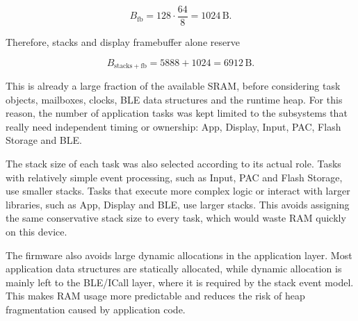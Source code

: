 \[
B_{\mathrm{fb}} =
128 \cdot \frac{64}{8}
=
1024\,\mathrm{B}.
\]

Therefore, stacks and display framebuffer alone reserve

\[
B_{\mathrm{stacks+fb}} =
5888 + 1024
=
6912\,\mathrm{B}.
\]

This is already a large fraction of the available SRAM, before considering task objects, mailboxes, clocks, BLE data structures and the runtime heap. For this reason, the number of application tasks was kept limited to the subsystems that really need independent timing or ownership: App, Display, Input, PAC, Flash Storage and BLE.

The stack size of each task was also selected according to its actual role. Tasks with relatively simple event processing, such as Input, PAC and Flash Storage, use smaller stacks. Tasks that execute more complex logic or interact with larger libraries, such as App, Display and BLE, use larger stacks. This avoids assigning the same conservative stack size to every task, which would waste RAM quickly on this device.

The firmware also avoids large dynamic allocations in the application layer. Most application data structures are statically allocated, while dynamic allocation is mainly left to the BLE/ICall layer, where it is required by the stack event model. This makes RAM usage more predictable and reduces the risk of heap fragmentation caused by application code.


